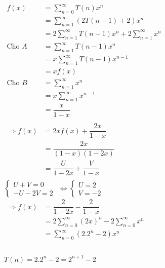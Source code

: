 \documentclass[12pt, letterpaper]{article}
\begin{document}
\begin{enumerate}
	       \\
	      $\begin{aligned}
			      f(x)             & = \sum_{n=0}^{\infty} T(n)x^n                                 \\
			                       & = \sum_{n=1}^{\infty} (2T(n-1) + 2)x^n                        \\
			                       & = 2\sum_{n=1}^{\infty} T(n-1)x^{n} + 2\sum_{n=1}^{\infty} x^n \\
			      \text{Cho } A    & = \sum_{n=1}^{\infty} T(n-1)x^{n}                             \\
			                       & = x\sum_{n=1}^{\infty} T(n-1)x^{n-1}                          \\
			                       & = xf(x)                                                       \\
			      \text{Cho } B    & = \sum_{n=1}^{\infty} x^n                                     \\
			                       & = x\sum_{n=1}^{\infty} x^{n-1}                                \\
			                       & = \dfrac{x}{1-x}                                              \\ \\
			      \Rightarrow f(x) & = 2xf(x) + \dfrac{2x}{1-x}                                    \\
			                       & = \dfrac{2x}{(1-x)(1-2x)}                                     \\
			                       & = \dfrac{U}{1-2x} + \dfrac{V}{1-x}                            \\
		      \end{aligned}$ \\

	      $\begin{cases}
			      U + V = 0 \\
			      -U - 2V = 2
		      \end{cases}$
	      $\Leftrightarrow \begin{cases}
			      U = 2 \\
			      V = -2
		      \end{cases}$ \\

	      $\begin{aligned}
			      \Rightarrow f(x) & = \dfrac{2}{1-2x} - \dfrac{2}{1-x}                       \\
			                       & = 2\sum_{n=0}^{\infty} (2x)^n - 2\sum_{n=0}^{\infty} x^n \\
			                       & = \sum_{n=0}^{\infty} (2.2^n - 2)x^n                     \\
		      \end{aligned}$ \\
	       \\
	      $T(n) = 2.2^n - 2 = 2^{n+1} - 2$
\end{enumerate}
\end{document}
